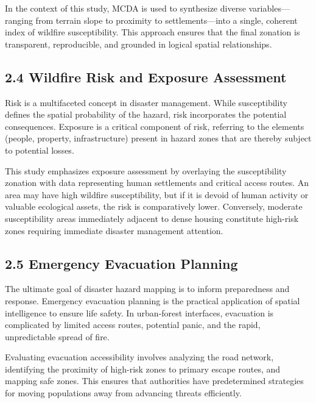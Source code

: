 \documentclass[12pt,a4paper]{article}
\begin{document}
In the context of this study, MCDA is used to synthesize diverse variables—ranging from terrain slope to proximity to settlements—into a single, coherent index of wildfire susceptibility. This approach ensures that the final zonation is transparent, reproducible, and grounded in logical spatial relationships.



\subsection*{2.4 Wildfire Risk and Exposure Assessment}

Risk is a multifaceted concept in disaster management. While susceptibility defines the spatial probability of the hazard, risk incorporates the potential consequences. Exposure is a critical component of risk, referring to the elements (people, property, infrastructure) present in hazard zones that are thereby subject to potential losses.


This study emphasizes exposure assessment by overlaying the susceptibility zonation with data representing human settlements and critical access routes. An area may have high wildfire susceptibility, but if it is devoid of human activity or valuable ecological assets, the risk is comparatively lower. Conversely, moderate susceptibility areas immediately adjacent to dense housing constitute high-risk zones requiring immediate disaster management attention.



\subsection*{2.5 Emergency Evacuation Planning}

The ultimate goal of disaster hazard mapping is to inform preparedness and response. Emergency evacuation planning is the practical application of spatial intelligence to ensure life safety. In urban-forest interfaces, evacuation is complicated by limited access routes, potential panic, and the rapid, unpredictable spread of fire.


Evaluating evacuation accessibility involves analyzing the road network, identifying the proximity of high-risk zones to primary escape routes, and mapping safe zones. This ensures that authorities have predetermined strategies for moving populations away from advancing threats efficiently.
\end{document}
